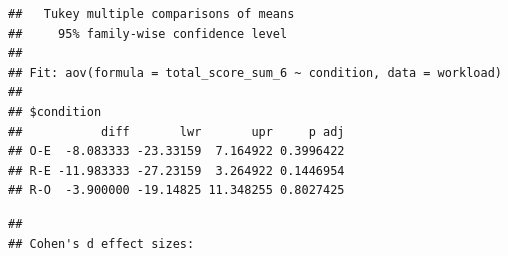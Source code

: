 \documentclass[
]{article}
\newenvironment{Shaded}{\begin{snugshade}}{\end{snugshade}}
\newcommand{\CommentTok}[1]{\textcolor[rgb]{0.56,0.35,0.01}{\textit{#1}}}
\newcommand{\FunctionTok}[1]{\textcolor[rgb]{0.13,0.29,0.53}{\textbf{#1}}}
\newcommand{\NormalTok}[1]{#1}
\newcommand{\OtherTok}[1]{\textcolor[rgb]{0.56,0.35,0.01}{#1}}
\newcommand{\SpecialCharTok}[1]{\textcolor[rgb]{0.81,0.36,0.00}{\textbf{#1}}}
\newcommand{\StringTok}[1]{\textcolor[rgb]{0.31,0.60,0.02}{#1}}
\begin{document}
\begin{verbatim}
##   Tukey multiple comparisons of means
##     95% family-wise confidence level
## 
## Fit: aov(formula = total_score_sum_6 ~ condition, data = workload)
## 
## $condition
##           diff       lwr       upr     p adj
## O-E  -8.083333 -23.33159  7.164922 0.3996422
## R-E -11.983333 -27.23159  3.264922 0.1446954
## R-O  -3.900000 -19.14825 11.348255 0.8027425
\end{verbatim}

\begin{Shaded}
\end{Shaded}

\begin{verbatim}
## 
## Cohen's d effect sizes:
\end{verbatim}
\end{document}
